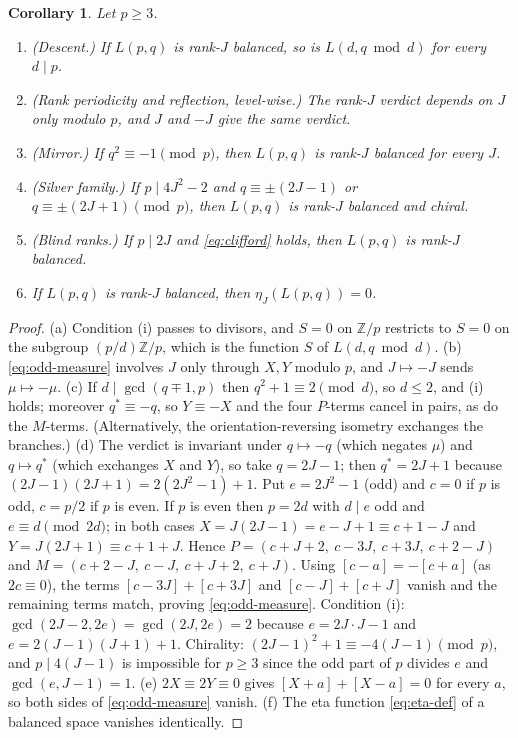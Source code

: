 \documentclass[11pt]{article}
\newtheorem{corollary}[theorem]{Corollary}
\theoremstyle{definition}
\newcommand{\Z}{\mathbb Z}
\begin{document}
\begin{corollary}
\label{cor:criterion-consequences}
Let $p\geq3$.
\begin{enumerate}[label=(\alph*)]
\item \textup{(Descent.)}  If $L(p,q)$ is rank-$J$ balanced, so is
$L(d,q\bmod d)$ for every $d\mid p$.
\item \textup{(Rank periodicity and reflection, level-wise.)}  The
rank-$J$ verdict depends on $J$ only modulo $p$, and $J$ and $-J$ give
the same verdict.
\item \textup{(Mirror.)}  If $q^2\equiv-1\pmod p$, then $L(p,q)$ is
rank-$J$ balanced for every $J$.
\item \textup{(Silver family.)}  If $p\mid4J^2-2$ and
$q\equiv\pm(2J-1)$ or $q\equiv\pm(2J+1)\pmod p$, then $L(p,q)$ is
rank-$J$ balanced and chiral.
\item \textup{(Blind ranks.)}  If $p\mid2J$ and \eqref{eq:clifford} holds,
then $L(p,q)$ is rank-$J$ balanced.
\item If $L(p,q)$ is rank-$J$ balanced, then $\eta_J(L(p,q))=0$.
\end{enumerate}
\end{corollary}

\begin{proof}
(a) Condition (i) passes to divisors, and $S=0$ on $\Z/p$ restricts to
$S=0$ on the subgroup $(p/d)\Z/p$, which is the function $S$ of
$L(d,q\bmod d)$.
(b) \eqref{eq:odd-measure} involves $J$ only through $X,Y$ modulo $p$,
and $J\mapsto-J$ sends $\mu\mapsto-\mu$.
(c) If $d\mid\gcd(q\mp1,p)$ then $q^2+1\equiv2\pmod d$, so $d\leq2$, and
(i) holds; moreover $q^*\equiv-q$, so $Y\equiv-X$ and the four $P$-terms
cancel in pairs, as do the $M$-terms.  (Alternatively, the
orientation-reversing isometry exchanges the branches.)
(d) The verdict is invariant under $q\mapsto-q$ (which negates $\mu$) and
$q\mapsto q^*$ (which exchanges $X$ and $Y$), so take $q=2J-1$; then
$q^*=2J+1$ because $(2J-1)(2J+1)=2(2J^2-1)+1$.  Put $e=2J^2-1$ (odd) and
$c=0$ if $p$ is odd, $c=p/2$ if $p$ is even.  If $p$ is even then $p=2d$
with $d\mid e$ odd and $e\equiv d\pmod{2d}$; in both cases
$X=J(2J-1)=e-J+1\equiv c+1-J$ and $Y=J(2J+1)\equiv c+1+J$.  Hence
$P=(c+J+2,\ c-3J,\ c+3J,\ c+2-J)$ and $M=(c+2-J,\ c-J,\ c+J+2,\ c+J)$.
Using $[c-a]=-[c+a]$ (as $2c\equiv0$), the terms $[c-3J]+[c+3J]$ and
$[c-J]+[c+J]$ vanish and the remaining terms match, proving
\eqref{eq:odd-measure}.  Condition (i): $\gcd(2J-2,2e)=\gcd(2J,2e)=2$
because $e=2J\cdot J-1$ and $e=2(J-1)(J+1)+1$.  Chirality:
$(2J-1)^2+1\equiv-4(J-1)\pmod p$, and $p\mid4(J-1)$ is impossible for
$p\geq3$ since the odd part of $p$ divides $e$ and $\gcd(e,J-1)=1$.
(e) $2X\equiv2Y\equiv0$ gives $[X+a]+[X-a]=0$ for every $a$, so both
sides of \eqref{eq:odd-measure} vanish.
(f) The eta function \eqref{eq:eta-def} of a balanced space vanishes
identically.
\end{proof}
\end{document}

